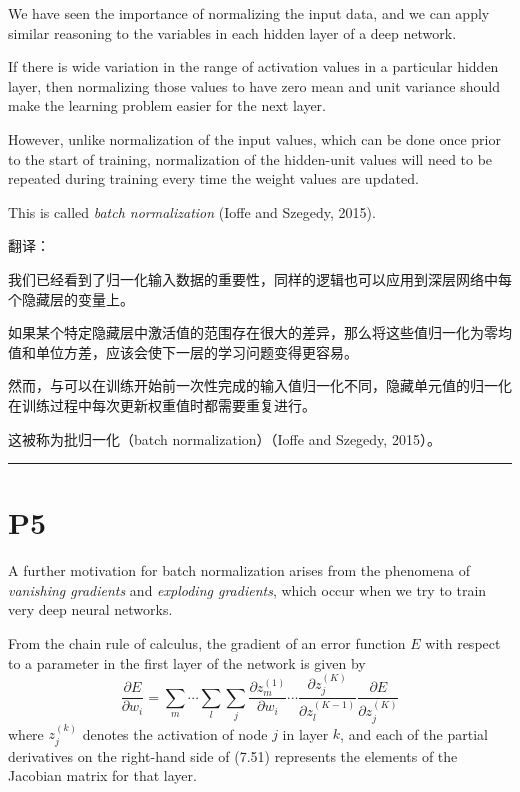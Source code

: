 \documentclass{article}
\begin{document}
We have seen the importance of normalizing the input data, and we can apply similar reasoning to the variables in each hidden layer of a deep network. 

If there is wide variation in the range of activation values in a particular hidden layer, then normalizing those values to have zero mean and unit variance should make the learning problem easier for the next layer. 

However, unlike normalization of the input values, which can be done once prior to the start of training, normalization of the hidden-unit values will need to be repeated during training every time the weight values are updated. 

This is called \emph{batch normalization} (Ioffe and Szegedy, 2015).


{\color{red}
翻译：

我们已经看到了归一化输入数据的重要性，同样的逻辑也可以应用到深层网络中每个隐藏层的变量上。

如果某个特定隐藏层中激活值的范围存在很大的差异，那么将这些值归一化为零均值和单位方差，应该会使下一层的学习问题变得更容易。

然而，与可以在训练开始前一次性完成的输入值归一化不同，隐藏单元值的归一化在训练过程中每次更新权重值时都需要重复进行。

这被称为批归一化（batch normalization）（Ioffe and Szegedy, 2015）。

}

\noindent\rule{\linewidth}{0.4pt}

\section{P5}

A further motivation for batch normalization arises from the phenomena of \emph{vanishing gradients} and \emph{exploding gradients}, which occur when we try to train very deep neural networks. 

From the chain rule of calculus, the gradient of an error function $E$ with respect to a parameter in the first layer of the network is given by
\begin{equation}
    \frac{\partial E}{\partial w_i} = 
    \sum_m \cdots \sum_l \sum_j 
    \frac{\partial z_m^{(1)}}{\partial w_i}
    \cdots
    \frac{\partial z_j^{(K)}}{\partial z_l^{(K-1)}}
    \frac{\partial E}{\partial z_j^{(K)}} \tag{7.51}
\end{equation}
where $z_j^{(k)}$ denotes the activation of node $j$ in layer $k$, and each of the partial derivatives on the right-hand side of (7.51) represents the elements of the Jacobian matrix for that layer. 
\end{document}
